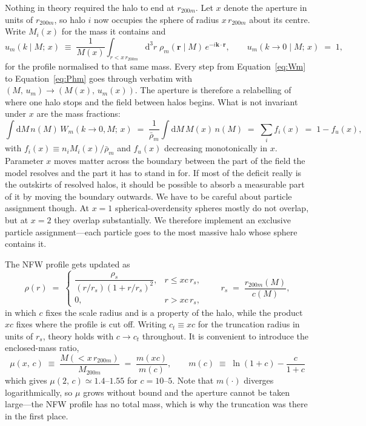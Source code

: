 \documentclass{article}
\newcommand{\dd}{\mathrm{d}}
\begin{document}
Nothing in theory required the halo to end at $r_{200m}$. Let $x$ denote the aperture in units of $r_{200m}$, so halo $i$ now occupies the
sphere of radius $x\,r_{200m}$ about its centre. Write $M_i(x)$ for the
mass it contains and
\begin{equation}
  u_m(k \mid M;\,x) \;\equiv\; \frac{1}{M(x)}
  \int_{r<x\,r_{200m}}\!\!\! \dd^3 r\; \rho_m(\mathbf{r}\mid M)\, e^{-i\mathbf{ k}\cdot\mathbf{r}},
  \qquad u_m(k\to0\mid M;\,x)\;=\;1,
  \label{eq:B-um}
\end{equation}
for the profile normalised to that same mass. Every step from Equation~\eqref{eq:Wm} to Equation~\eqref{eq:Phm}
goes through verbatim with $(M,\,u_m)\to(M(x),\,u_m(x))$. The aperture is
therefore a relabelling of where one halo
stops and the field between halos begins.
What is not invariant under $x$ are the mass fractions:
\begin{equation}
  \int\!\dd M\, n(M)\, W_m(k\to0,M;\,x)
  \;=\; \frac{1}{\bar\rho_m}\int\!\dd M\, M(x)\, n(M)
  \;=\; \sum_i f_i(x) \;=\; 1 - f_u(x),
  \label{eq:B-sumrule}
\end{equation}
with $f_i(x) \equiv {n_i M_i(x)}/{\bar\rho_m}$ and $f_u(x)$ decreasing monotonically in $x$. Parameter $x$ moves matter across the boundary between the part of the field
the model resolves and the part it has to stand in for. If most of the deficit really is the outskirts of resolved
halos, it should be possible to absorb a measurable part of it by moving the
boundary outwards. We have to be careful about particle assignment though. At $x=1$ spherical-overdensity spheres
mostly do not overlap, but at $x=2$ they overlap
substantially. We therefore implement an exclusive particle assignment---each particle goes to the most
massive halo whose sphere contains it. 

The NFW profile gets updated as 
\begin{equation}
  \rho(r) \;=\;
  \begin{cases}
    \dfrac{\rho_s}{(r/r_s)\left(1+r/r_s\right)^2}, & r \le xc\,r_s,\\[2ex]
    0, & r > xc\,r_s,
  \end{cases}
  \qquad r_s \;=\; \frac{r_{200m}(M)}{c(M)},
  \label{eq:B-nfw}
\end{equation}
in which $c$ fixes the scale radius and is a property of the halo, while the
product $xc$ fixes where the profile is cut off. Writing $c_t \equiv x c$ for the truncation radius in units of $r_s$, theory holds with $c\to c_t$ throughout. It is convenient to introduce the enclosed-mass ratio,
\begin{equation}
  \mu(x,\,c) \;\equiv\; \frac{M(<x\,r_{200m})}{M_{200m}} \;=\; \frac{m(xc)}{m(c)}, \qquad
  m(c) \;\equiv\; \ln(1+c)-\frac{c}{1+c}
  \label{eq:B-mu}
\end{equation}
which gives $\mu(2,\,c)\simeq1.4$--$1.55$ for
$c=10$--$5$. Note that $m(\cdot)$ diverges
logarithmically, so $\mu$ grows without bound and the aperture cannot be taken
large---the NFW profile has no total mass, which is why the truncation was
there in the first place.
\end{document}
